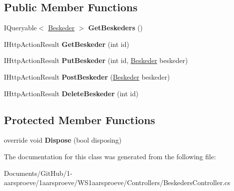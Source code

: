 \subsection*{Public Member Functions}
\begin{DoxyCompactItemize}
\item 
\hypertarget{class_w_s1aarsproeve_1_1_controllers_1_1_beskeders_controller_a4040005e2a34cbaa959ea7e5957500c0}{}I\+Queryable$<$ \hyperlink{class_w_s1aarsproeve_1_1_beskeder}{Beskeder} $>$ {\bfseries Get\+Beskeders} ()\label{class_w_s1aarsproeve_1_1_controllers_1_1_beskeders_controller_a4040005e2a34cbaa959ea7e5957500c0}

\item 
\hypertarget{class_w_s1aarsproeve_1_1_controllers_1_1_beskeders_controller_abe70f47b2f3911726fb9b7f0bf8c3e3d}{}I\+Http\+Action\+Result {\bfseries Get\+Beskeder} (int id)\label{class_w_s1aarsproeve_1_1_controllers_1_1_beskeders_controller_abe70f47b2f3911726fb9b7f0bf8c3e3d}

\item 
\hypertarget{class_w_s1aarsproeve_1_1_controllers_1_1_beskeders_controller_a0069b70d45069d85445d7435fb29c23e}{}I\+Http\+Action\+Result {\bfseries Put\+Beskeder} (int id, \hyperlink{class_w_s1aarsproeve_1_1_beskeder}{Beskeder} beskeder)\label{class_w_s1aarsproeve_1_1_controllers_1_1_beskeders_controller_a0069b70d45069d85445d7435fb29c23e}

\item 
\hypertarget{class_w_s1aarsproeve_1_1_controllers_1_1_beskeders_controller_a0e616763464095dcf83536a282c12701}{}I\+Http\+Action\+Result {\bfseries Post\+Beskeder} (\hyperlink{class_w_s1aarsproeve_1_1_beskeder}{Beskeder} beskeder)\label{class_w_s1aarsproeve_1_1_controllers_1_1_beskeders_controller_a0e616763464095dcf83536a282c12701}

\item 
\hypertarget{class_w_s1aarsproeve_1_1_controllers_1_1_beskeders_controller_ab5c7f26e503324a054c2761b21a2b092}{}I\+Http\+Action\+Result {\bfseries Delete\+Beskeder} (int id)\label{class_w_s1aarsproeve_1_1_controllers_1_1_beskeders_controller_ab5c7f26e503324a054c2761b21a2b092}

\end{DoxyCompactItemize}
\subsection*{Protected Member Functions}
\begin{DoxyCompactItemize}
\item 
\hypertarget{class_w_s1aarsproeve_1_1_controllers_1_1_beskeders_controller_a381d5cf463ae84115d93dc66dfe201a4}{}override void {\bfseries Dispose} (bool disposing)\label{class_w_s1aarsproeve_1_1_controllers_1_1_beskeders_controller_a381d5cf463ae84115d93dc66dfe201a4}

\end{DoxyCompactItemize}


The documentation for this class was generated from the following file\+:\begin{DoxyCompactItemize}
\item 
Documents/\+Git\+Hub/1-\/aarsproeve/1aarsproeve/\+W\+S1aarsproeve/\+Controllers/Beskeders\+Controller.\+cs\end{DoxyCompactItemize}
